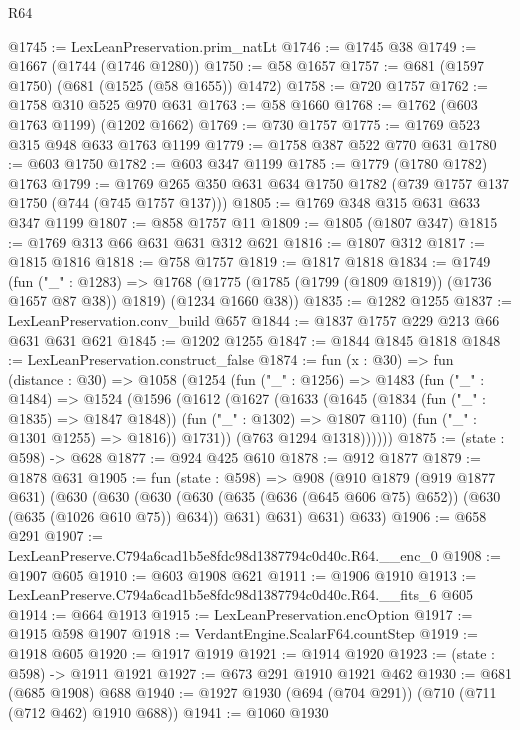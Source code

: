 \begin{lexlean}{R64}
\begin{coremodule}
@1745 := LexLeanPreservation.prim_natLt
@1746 := @1745 @38
@1749 := @1667 (@1744 (@1746 @1280))
@1750 := @58 @1657
@1757 := @681 (@1597 @1750) (@681 (@1525 (@58 @1655)) @1472)
@1758 := @720 @1757
@1762 := @1758 @310 @525 @970 @631
@1763 := @58 @1660
@1768 := @1762 (@603 @1763 @1199) (@1202 @1662)
@1769 := @730 @1757
@1775 := @1769 @523 @315 @948 @633 @1763 @1199
@1779 := @1758 @387 @522 @770 @631
@1780 := @603 @1750
@1782 := @603 @347 @1199
@1785 := @1779 (@1780 @1782) @1763
@1799 := @1769 @265 @350 @631 @634 @1750 @1782 (@739 @1757 @137 @1750 (@744 (@745 @1757 @137)))
@1805 := @1769 @348 @315 @631 @633 @347 @1199
@1807 := @858 @1757 @11
@1809 := @1805 (@1807 @347)
@1815 := @1769 @313 @66 @631 @631 @312 @621
@1816 := @1807 @312
@1817 := @1815 @1816
@1818 := @758 @1757
@1819 := @1817 @1818
@1834 := @1749
    (fun ("_" : @1283) =>
    @1768 (@1775 (@1785 (@1799 (@1809 @1819)) (@1736 @1657 @87 @38)) @1819) (@1234 @1660 @38))
@1835 := @1282 @1255
@1837 := LexLeanPreservation.conv_build @657
@1844 := @1837 @1757 @229 @213 @66 @631 @631 @621
@1845 := @1202 @1255
@1847 := @1844 @1845 @1818
@1848 := LexLeanPreservation.construct_false
@1874 := fun (x : @30) =>
  fun (distance : @30) =>
  @1058
    (@1254
      (fun ("_" : @1256) =>
      @1483
        (fun ("_" : @1484) =>
        @1524
          (@1596
            (@1612
              (@1627
                (@1633
                  (@1645
                    (@1834 (fun ("_" : @1835) => @1847 @1848))
                    (fun ("_" : @1302) => @1807 @110)
                    (fun ("_" : @1301 @1255) => @1816))
                  @1731))
              (@763 @1294 @1318))))))
@1875 := (state : @598) -> @628
@1877 := @924 @425 @610
@1878 := @912 @1877
@1879 := @1878 @631
@1905 := fun (state : @598) =>
  @908
    (@910
      @1879
      (@919 @1877 @631)
      (@630
        (@630
          (@630 (@630 (@635 (@636 (@645 @606 @75) @652)) (@630 (@635 (@1026 @610 @75)) @634)) @631)
          @631)
        @631)
      @633)
@1906 := @658 @291
@1907 := LexLeanPreserve.C794a6cad1b5e8fdc98d1387794c0d40c.R64.__enc_0
@1908 := @1907 @605
@1910 := @603 @1908 @621
@1911 := @1906 @1910
@1913 := LexLeanPreserve.C794a6cad1b5e8fdc98d1387794c0d40c.R64.__fits_6 @605
@1914 := @664 @1913
@1915 := LexLeanPreservation.encOption
@1917 := @1915 @598 @1907
@1918 := VerdantEngine.ScalarF64.countStep
@1919 := @1918 @605
@1920 := @1917 @1919
@1921 := @1914 @1920
@1923 := (state : @598) -> @1911 @1921
@1927 := @673 @291 @1910 @1921 @462
@1930 := @681 (@685 @1908) @688
@1940 := @1927 @1930 (@694 (@704 @291)) (@710 (@711 (@712 @462) @1910 @688))
@1941 := @1060 @1930

\end{coremodule}
\end{lexlean}
